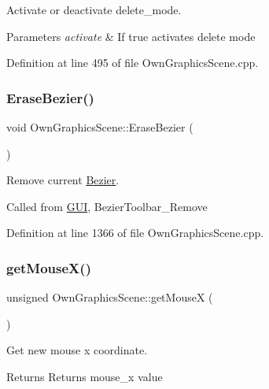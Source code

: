 Activate or deactivate delete\+\_\+mode. 


\begin{DoxyParams}{Parameters}
{\em activate} & If true activates delete mode \\
\hline
\end{DoxyParams}


Definition at line 495 of file Own\+Graphics\+Scene.\+cpp.

\mbox{\label{classOwnGraphicsScene_a7b205ba3c4db5e88f60f1f327175b5b6}} 
\subsubsection{\texorpdfstring{Erase\+Bezier()}{EraseBezier()}}
{\footnotesize\ttfamily void Own\+Graphics\+Scene\+::\+Erase\+Bezier (\begin{DoxyParamCaption}{ }\end{DoxyParamCaption})}



Remove current \mbox{\hyperlink{classBezier}{Bezier}}. 

Called from \mbox{\hyperlink{classGUI}{G\+UI}}, Bezier\+Toolbar\+\_\+\+Remove 

Definition at line 1366 of file Own\+Graphics\+Scene.\+cpp.

\mbox{\label{classOwnGraphicsScene_a6e54bd43db758bcd4f7cc1dd4544232e}} 
\subsubsection{\texorpdfstring{get\+Mouse\+X()}{getMouseX()}}
{\footnotesize\ttfamily unsigned Own\+Graphics\+Scene\+::get\+MouseX (\begin{DoxyParamCaption}{ }\end{DoxyParamCaption})\hspace{0.3cm}{\ttfamily [inline]}}



Get new mouse x coordinate. 

\begin{DoxyReturn}{Returns}
Returns mouse\+\_\+x value 
\end{DoxyReturn}


